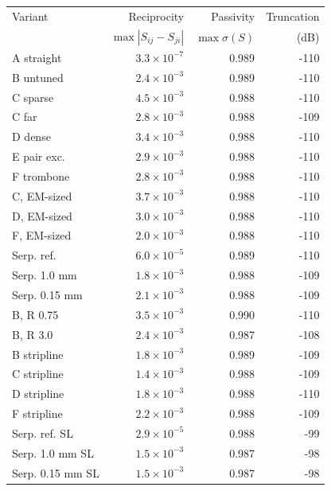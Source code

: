 \begin{tabular}{@{}lrrr@{}}\toprule
Variant & Reciprocity & Passivity & Truncation \\
 & $\max|S_{ij}-S_{ji}|$ & $\max\sigma(S)$ & (dB) \\\midrule
A straight & $3.3\times10^{-7}$ & 0.989 & -110 \\
B untuned & $2.4\times10^{-3}$ & 0.989 & -110 \\
C sparse & $4.5\times10^{-3}$ & 0.988 & -110 \\
C far & $2.8\times10^{-3}$ & 0.988 & -109 \\
D dense & $3.4\times10^{-3}$ & 0.988 & -110 \\
E pair exc. & $2.9\times10^{-3}$ & 0.988 & -110 \\
F trombone & $2.8\times10^{-3}$ & 0.988 & -110 \\
C, EM-sized & $3.7\times10^{-3}$ & 0.988 & -110 \\
D, EM-sized & $3.0\times10^{-3}$ & 0.988 & -110 \\
F, EM-sized & $2.0\times10^{-3}$ & 0.988 & -110 \\
Serp. ref. & $6.0\times10^{-5}$ & 0.989 & -110 \\
Serp. 1.0 mm & $1.8\times10^{-3}$ & 0.988 & -109 \\
Serp. 0.15 mm & $2.1\times10^{-3}$ & 0.988 & -109 \\
B, R 0.75 & $3.5\times10^{-3}$ & 0.990 & -110 \\
B, R 3.0 & $2.4\times10^{-3}$ & 0.987 & -108 \\
B stripline & $1.8\times10^{-3}$ & 0.989 & -109 \\
C stripline & $1.4\times10^{-3}$ & 0.988 & -109 \\
D stripline & $1.8\times10^{-3}$ & 0.988 & -110 \\
F stripline & $2.2\times10^{-3}$ & 0.988 & -109 \\
Serp. ref. SL & $2.9\times10^{-5}$ & 0.988 & -99 \\
Serp. 1.0 mm SL & $1.5\times10^{-3}$ & 0.987 & -98 \\
Serp. 0.15 mm SL & $1.5\times10^{-3}$ & 0.987 & -98 \\
\bottomrule\end{tabular}
